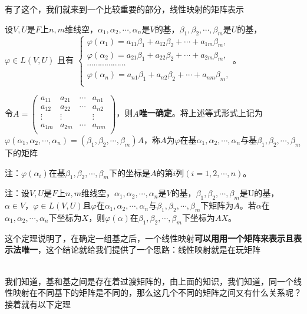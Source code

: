 \documentclass[lang=cn,10pt]{elegantbook}
\begin{document}
	有了这个，我们就来到一个比较重要的部分，线性映射的矩阵表示
	\begin{definition}[线性映射矩阵表示]
		设$V,U$是$F$上$n,m$维线空，$\alpha_1,\alpha_2,\cdots,\alpha_n$是$V$的基，$\beta_1,\beta_2,\cdots,\beta_m$是$U$的基，$\varphi\in L(V,U)$
		且有
		$\left
		\{\begin{matrix}\varphi(\alpha_1)=a_{11}\beta_1+a_{12}\beta_2+\cdots+a_{1m}\beta_m,\\\varphi(\alpha_2)=a_{21}\beta_1+a_{22}\beta_2+\cdots+a_{2m}\beta_m,\\\cdots\cdots\cdots\cdots\cdots\cdots\\\varphi(\alpha_n)=a_{n1}\beta_1+a_{n2}\beta_2+\cdots+a_{nm}\beta_m,\\\end{matrix}\right.$。
		
		令$A=
		\left(\begin{matrix}a_{11}&a_{21}&\cdots&a_{n1}\\a_{12}&a_{22}&\cdots&a_{n2}\\\vdots&\vdots&&\vdots\\a_{1m}&a_{2m}&\cdots&a_{nm}\\
		\end{matrix}
		\right)$，则$A$\textbf{唯一确定}。将上述等式形式上记为
	$	\varphi(\alpha_1,\alpha_2,\cdots,\alpha_n)=(\beta_1,\beta_2,\cdots,\beta_m)A$，称$A$为$\varphi$在基$\alpha_1,\alpha_2,\cdots,\alpha_n$与基$\beta_1,\beta_2,\cdots,\beta_m$下的矩阵
	\end{definition}
	注：$\varphi(\alpha_i)$在基$\beta_1,\beta_2,\cdots,\beta_m$下的坐标是$A$的第$i$列$(i=1,2,\cdots,n)$。
	
	注：设$V,U$是$F$上$n,m$维线空，$\alpha_1,\alpha_2,\cdots,\alpha_n$是$V$的基，$\beta_1,\beta_2,\cdots,\beta_m$是U的基，$\alpha\in V，\varphi\in L(V,U)$且$\varphi$在$\alpha_1,\alpha_2,\cdots,\alpha_n与\beta_1,\beta_2,\cdots,\beta_m$下矩阵为$A$。若$\alpha$在$\alpha_1,\alpha_2,\cdots,\alpha_n$下坐标为$X$，则$\varphi(\alpha)$在$\beta_1,\beta_2,\cdots,\beta_m$下坐标为$AX$。
	
	这个定理说明了，在确定一组基之后，一个线性映射\textbf{可以用用一个矩阵来表示且表示法唯一}，这个结论就给我们提供了一个思路：线性映射就是在玩矩阵
	
	~\\
	我们知道，基和基之间是存在着过渡矩阵的，由上面的知识，我们知道，同一个线性映射在不同基下的矩阵是不同的，那么这几个不同的矩阵之间又有什么关系呢？接着就有以下定理
	
\end{document}
